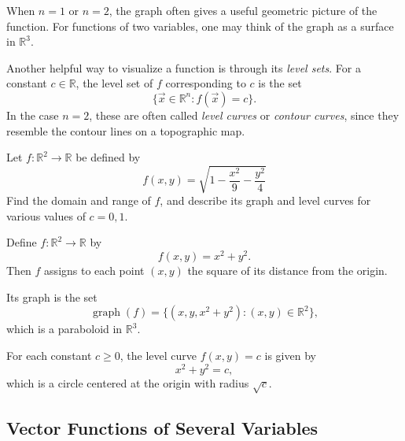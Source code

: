 When $n=1$ or $n=2$, the graph often gives a useful geometric picture of the function. For functions of two variables, one may think of the graph as a surface in $\mathbb{R}^3$.

Another helpful way to visualize a function is through its \emph{level sets}. For a constant $c\in\mathbb{R}$, the level set of $f$ corresponding to $c$ is the set
\[
\{\vec x\in\mathbb{R}^n : f(\vec x)=c\}.
\]
In the case $n=2$, these are often called \emph{level curves} or \emph{contour curves}, since they resemble the contour lines on a topographic map.

\begin{example}
    Let $f:\mathbb{R}^2\to\mathbb{R}$ be defined by
    \[
     f(x,y)=\sqrt{1-\frac{x^2}{9}-\frac{y^2}{4}}
    \]
    Find the domain and range of $f$, and describe its graph and level curves for various values of $c=0,1$.
\end{example}

\begin{example}
Define $f:\mathbb{R}^2\to\mathbb{R}$ by
\[
f(x,y)=x^2+y^2.
\]
Then $f$ assigns to each point $(x,y)$ the square of its distance from the origin.

Its graph is the set
\[
\operatorname{graph}(f)
=
\{(x,y,x^2+y^2): (x,y)\in\mathbb{R}^2\},
\]
which is a paraboloid in $\mathbb{R}^3$.

For each constant $c\ge 0$, the level curve $f(x,y)=c$ is given by
\[
x^2+y^2=c,
\]
which is a circle centered at the origin with radius $\sqrt{c}$.
\begin{center}
\end{center}
\end{example}
\subsection{Vector Functions of Several Variables}

